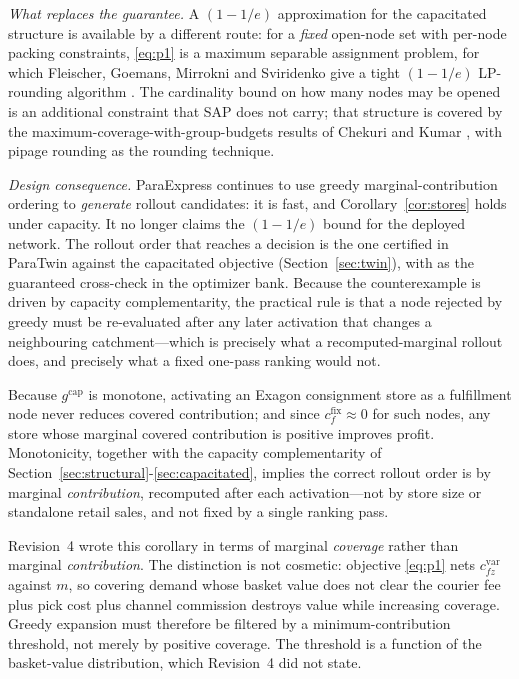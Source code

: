 \emph{What replaces the guarantee.} A $(1-1/e)$ approximation for the capacitated structure is available by a different route: for a \emph{fixed} open-node set with per-node packing constraints, \eqref{eq:p1} is a maximum separable assignment problem, for which Fleischer, Goemans, Mirrokni and Sviridenko give a tight $(1-1/e)$ LP-rounding algorithm \cite{fleischer2011}. The cardinality bound on how many nodes may be opened is an additional constraint that SAP does not carry; that structure is covered by the maximum-coverage-with-group-budgets results of Chekuri and Kumar \cite{chekuri2004}, with pipage rounding \cite{ageev2004} as the rounding technique.

\emph{Design consequence.} ParaExpress continues to use greedy marginal-contribution ordering to \emph{generate} rollout candidates: it is fast, and Corollary~\ref{cor:stores} holds under capacity. It no longer claims the $(1-1/e)$ bound for the deployed network. The rollout order that reaches a decision is the one certified in ParaTwin against the capacitated objective (Section~\ref{sec:twin}), with \cite{chekuri2004,fleischer2011} as the guaranteed cross-check in the optimizer bank. Because the counterexample is driven by capacity complementarity, the practical rule is that a node rejected by greedy must be re-evaluated after any later activation that changes a neighbouring catchment---which is precisely what a recomputed-marginal rollout does, and precisely what a fixed one-pass ranking would not.

\begin{corollary}\label{cor:stores}
Because $g^{\mathrm{cap}}$ is monotone, activating an Exagon consignment store as a fulfillment node never reduces covered contribution; and since $c^{\mathrm{fix}}_f\approx0$ for such nodes, any store whose marginal covered contribution is positive improves profit. Monotonicity, together with the capacity complementarity of Section~\ref{sec:structural}-\ref{sec:capacitated}, implies the correct rollout order is by marginal \emph{contribution}, recomputed after each activation---not by store size or standalone retail sales, and not fixed by a single ranking pass.
\end{corollary}

\begin{remark}
Revision~4 wrote this corollary in terms of marginal \emph{coverage} rather than marginal \emph{contribution}. The distinction is not cosmetic: objective \eqref{eq:p1} nets $c^{\mathrm{var}}_{fz}$ against $m$, so covering demand whose basket value does not clear the courier fee plus pick cost plus channel commission destroys value while increasing coverage. Greedy expansion must therefore be filtered by a minimum-contribution threshold, not merely by positive coverage. The threshold is a function of the basket-value distribution, which Revision~4 did not state. 
\end{remark}

